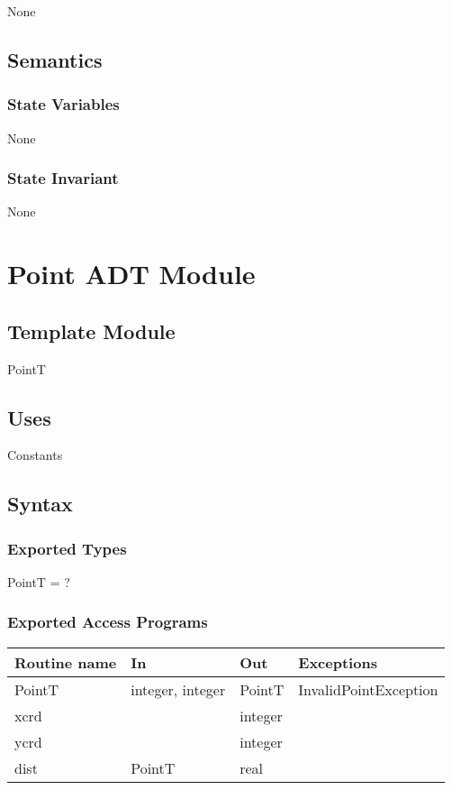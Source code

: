 \documentclass[12pt]{article}
\begin{document}
None

\subsection* {Semantics}

\subsubsection* {State Variables}

None

\subsubsection* {State Invariant}

None

\newpage

\section* {Point ADT Module}

\subsection*{Template Module}

PointT

\subsection* {Uses}

Constants

\subsection* {Syntax}

\subsubsection* {Exported Types}

PointT = ?

\subsubsection* {Exported Access Programs}

\begin{tabular}{| l | l | l | l |}
\hline
\textbf{Routine name} & \textbf{In} & \textbf{Out} & \textbf{Exceptions}\\
\hline
PointT & integer, integer & PointT & InvalidPointException\\
\hline
xcrd & ~ & integer & ~\\
\hline
ycrd & ~ & integer & ~\\
\hline
dist & PointT & real & ~\\
\hline
\end{tabular}
\end{document}
